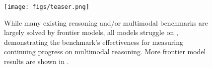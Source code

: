 \begin{figure}[t]
\centering
\texttt{[image: figs/teaser.png]}
\caption{While many existing reasoning and/or multimodal benchmarks are largely solved by frontier models, all models struggle on \enigmaeval, demonstrating the benchmark's effectiveness for measuring continuing progress on multimodal reasoning. More frontier model results are shown in .}
\label{fig:teaser}
\vspace{-2pt}
\end{figure}